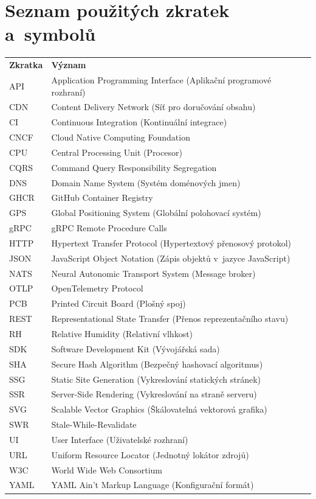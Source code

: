 \documentclass[11pt, a4paper, oneside]{article}
\begin{document}
\section*{Seznam použitých zkratek a~symbolů}
\begin{tabular}{ll}
\textbf{Zkratka} & \textbf{Význam} \\
API & Application Programming Interface (Aplikační programové rozhraní) \\
CDN & Content Delivery Network (Síť pro doručování obsahu) \\
CI & Continuous Integration (Kontinuální integrace) \\
CNCF & Cloud Native Computing Foundation \\
CPU & Central Processing Unit (Procesor) \\
CQRS & Command Query Responsibility Segregation \\
DNS & Domain Name System (Systém doménových jmen) \\
GHCR & GitHub Container Registry \\
GPS & Global Positioning System (Globální polohovací systém) \\
gRPC & gRPC Remote Procedure Calls \\
HTTP & Hypertext Transfer Protocol (Hypertextový přenosový protokol) \\
JSON & JavaScript Object Notation (Zápis objektů v~jazyce JavaScript) \\
NATS & Neural Autonomic Transport System (Message broker) \\
OTLP & OpenTelemetry Protocol \\
PCB & Printed Circuit Board (Plošný spoj) \\
REST & Representational State Transfer (Přenos reprezentačního stavu) \\
RH & Relative Humidity (Relativní vlhkost) \\
SDK & Software Development Kit (Vývojářská sada) \\
SHA & Secure Hash Algorithm (Bezpečný hashovací algoritmus) \\
SSG & Static Site Generation (Vykreslování statických stránek) \\
SSR & Server-Side Rendering (Vykreslování na straně serveru) \\
SVG & Scalable Vector Graphics (Škálovatelná vektorová grafika) \\
SWR & Stale-While-Revalidate \\
UI & User Interface (Uživatelské rozhraní) \\
URL & Uniform Resource Locator (Jednotný lokátor zdrojů) \\
W3C & World Wide Web Consortium \\
YAML & YAML Ain't Markup Language (Konfigurační formát) \\
\end{tabular}
\end{document}
